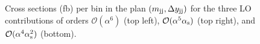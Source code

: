 \begin{figure}[ht]
\caption{Cross sections (fb) per bin in the plan $\left(m_{\text{j}\text{j}}, \Delta y_{\text{j}\text{j}}\right)$ for the three LO contributions of orders $\mathcal{O}(\alpha^6)$ (top left), $\mathcal{O}(\alpha^5\alpha_\text{s})$ (top right), and $\mathcal{O}(\alpha^4 \alpha_\text{s}^2)$ (bottom).}
\label{fig:mjjdyjj_2d_LO}
\end{figure}
